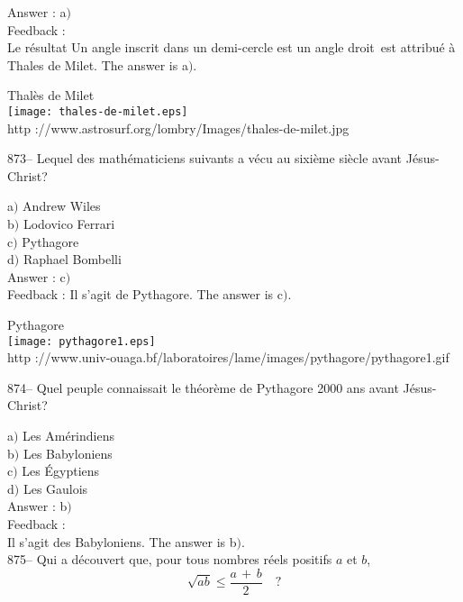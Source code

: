 ﻿\documentclass[letterpaper, 12pt]{article}
\begin{document}
Answer : a$)$\\

Feedback :\\
Le r\'esultat \og Un angle inscrit dans un demi-cercle est un angle
droit\fg\ est attribu\'e \`a Thales de Milet. The answer is a$)$.\\

        \begin{center}
        Thal\`es de Milet\\
    \texttt{[image: thales-de-milet.eps]}\\
        {\footnotesize http
://www.astrosurf.org/lombry/Images/thales-de-milet.jpg}
    \end{center}

873-- Lequel des math\'ematiciens suivants a v\'ecu au sixi\`eme
si\`ecle avant J\'esus-Christ?

a$)$ Andrew Wiles \\
b$)$ Lodovico Ferrari \\
c$)$ Pythagore \\
d$)$ Raphael Bombelli \\

Answer : c$)$\\

Feedback :
Il s'agit de Pythagore. The answer is c$)$.\\

        \begin{center}
        Pythagore\\
    \texttt{[image: pythagore1.eps]}\\
        {\footnotesize http
://www.univ-ouaga.bf/laboratoires/lame/images/pythagore/pythagore1.gif}
    \end{center}

874-- Quel peuple connaissait le th\'eor\`eme de Pythagore 2000 ans
avant J\'esus-Christ?

a$)$ Les Am\'erindiens \\
b$)$ Les Babyloniens \\
c$)$ Les \'Egyptiens \\
d$)$ Les Gaulois \\

Answer : b$)$\\

Feedback : \\
Il s'agit des Babyloniens. The answer is b$)$.\\

875-- Qui a d\'ecouvert que, pour tous nombres r\'eels positifs $a$ et $b$,
$$\sqrt{ab}\le\displaystyle\frac{a\,+\,b}2\quad?$$
\end{document}
